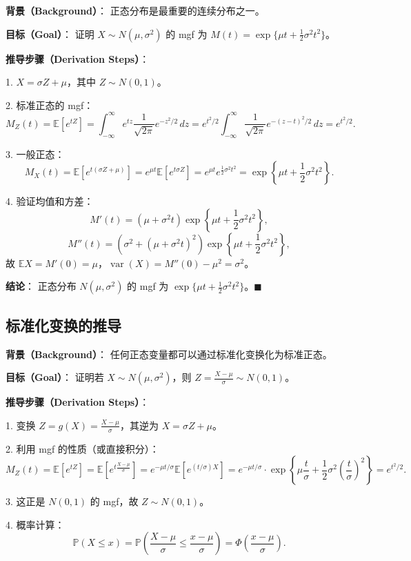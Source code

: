 \textbf{背景（Background）}：
正态分布是最重要的连续分布之一。

\textbf{目标（Goal）}：
证明 $X \sim N(\mu, \sigma^2)$ 的 mgf 为 $M(t) = \exp\{\mu t + \frac{1}{2}\sigma^2 t^2\}$。

\textbf{推导步骤（Derivation Steps）}：

1. $X = \sigma Z + \mu$，其中 $Z \sim N(0,1)$。

2. 标准正态的 mgf：
\[
M_Z(t) = \mathbb{E}[e^{tZ}] = \int_{-\infty}^{\infty} e^{tz} \frac{1}{\sqrt{2\pi}} e^{-z^2/2} \, dz = e^{t^2/2} \int_{-\infty}^{\infty} \frac{1}{\sqrt{2\pi}} e^{-(z-t)^2/2} \, dz = e^{t^2/2}.
\]

3. 一般正态：
\[
M_X(t) = \mathbb{E}[e^{t(\sigma Z + \mu)}] = e^{\mu t} \mathbb{E}[e^{t\sigma Z}] = e^{\mu t} e^{\frac{1}{2}\sigma^2 t^2} = \exp\left\{\mu t + \frac{1}{2}\sigma^2 t^2\right\}.
\]

4. 验证均值和方差：
\[
M'(t) = (\mu + \sigma^2 t) \exp\left\{\mu t + \frac{1}{2}\sigma^2 t^2\right\},
\]
\[
M''(t) = (\sigma^2 + (\mu + \sigma^2 t)^2) \exp\left\{\mu t + \frac{1}{2}\sigma^2 t^2\right\},
\]
故 $\mathbb{E}X = M'(0) = \mu$，$\operatorname{var}(X) = M''(0) - \mu^2 = \sigma^2$。

\textbf{结论}：
正态分布 $N(\mu, \sigma^2)$ 的 mgf 为 $\exp\{\mu t + \frac{1}{2}\sigma^2 t^2\}$。$\blacksquare$

\subsection{标准化变换的推导}\label{sec:normal-z-transform}

\textbf{背景（Background）}：
任何正态变量都可以通过标准化变换化为标准正态。

\textbf{目标（Goal）}：
证明若 $X \sim N(\mu, \sigma^2)$，则 $Z = \frac{X-\mu}{\sigma} \sim N(0,1)$。

\textbf{推导步骤（Derivation Steps）}：

1. 变换 $Z = g(X) = \frac{X-\mu}{\sigma}$，其逆为 $X = \sigma Z + \mu$。

2. 利用 mgf 的性质（或直接积分）：
\[
M_Z(t) = \mathbb{E}[e^{tZ}] = \mathbb{E}\left[e^{t\frac{X-\mu}{\sigma}}\right] = e^{-\mu t/\sigma} \mathbb{E}\left[e^{(t/\sigma)X}\right] = e^{-\mu t/\sigma} \cdot \exp\left\{\mu \frac{t}{\sigma} + \frac{1}{2}\sigma^2 \left(\frac{t}{\sigma}\right)^2\right\} = e^{t^2/2}.
\]

3. 这正是 $N(0,1)$ 的 mgf，故 $Z \sim N(0,1)$。

4. 概率计算：
\[
\mathbb{P}(X \leq x) = \mathbb{P}\left(\frac{X-\mu}{\sigma} \leq \frac{x-\mu}{\sigma}\right) = \Phi\left(\frac{x-\mu}{\sigma}\right).
\]

